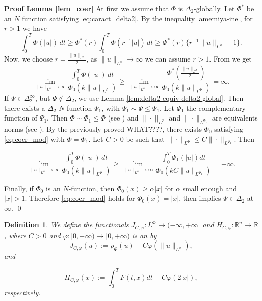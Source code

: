 \documentclass[twoside]{article}
\newtheorem{defi}[thm]{Definition}
\theoremstyle{remark}
\newcommand{\orlnor}{\|_{L^{\Phi}}}
\newcommand{\lphi}{L^{\Phi}}
\newcommand{\rr}{\mathbb{R}}
\renewcommand{\leq}{\leqslant}
\renewcommand{\geq}{\geqslant}
\begin{document}
\noindent\textbf{Proof Lemma \ref{lem_coer}} At first we assume that $\Phi$ is $\Delta_2$-globally. Let $\Phi^*$ be an $N$ function satisfying \eqref{eq:caract_delta2}. By the inequality \eqref{amemiya-ine}, for $r>1$ we have
\[
\int_0^T \Phi(|u|)\,dt\geq
\Phi^*(r) \int_0^T \Phi(r^{-1}|u|)\,dt\geq
\Phi^*(r)\{r^{-1}\|u\orlnor-1\}.
\]
Now, we choose $r=\frac{\|u\orlnor}{2}$, as $\|u\orlnor\to\infty$ we can assume $r>1$. From \cite[Thm. 2 (b)(v), p. 16]{rao1991theory} we get
\[
\lim\limits_{\|u\orlnor \to \infty} \frac{\int_0^T \Phi(|u|)\,dt}{\Phi_0(k\|u\orlnor)}\geq
\lim\limits_{\|u\orlnor \to \infty} \frac{\Phi^*\left(\frac{\|u\orlnor}{2}\right)}{\Phi_0(k\|u\orlnor)}
=\infty.
\]
 If $\Psi\in\Delta_2^{\infty}$, but $\Psi\notin\Delta_2$, we  use Lemma \ref{lem:delta2-equiv-delta2-global}. Then there exists a $\Delta_2$ $N$-function $\Psi_1$, with $\Psi_1\sim\Psi\leq \Psi_1$. Let $\Phi_1$ the complementary function of $\Psi_1$. Then $\Phi\sim\Phi_1\leq \Phi$ (see \cite[Thm. 3.1]{KR}) and $\|\cdot\orlnor$ and $\|\cdot\|_{L^{\Phi_1}}$ are equivalents norms  (see \cite[Thm. 13.2 and Thm. 13.3]{KR}). By the previously proved WHAT????, there exists $\Phi_0$ satisfying  \eqref{eq:coer_mod} with $\Phi=\Phi_1$. Let $C>0$ be such that  $\|\cdot\orlnor\leq C\|\cdot\|_{L^{\Phi_1}}$. Then

\[\lim\limits_{\|u\orlnor \to \infty}\frac{\int_0^T \Phi(|u|)\,dt}{\Phi_0(k\|u\orlnor)}\geq \lim\limits_{\|u\orlnor \to \infty} \frac{\int_0^T \Phi_1(|u|)dt}{\Phi_0(kC\|u\|_{L^{\Phi_1}})}=+\infty.\]


Finally, if $\Phi_0$ is an $N$-function, then $\Phi_0(x)\geq \alpha |x|$ for  $\alpha$ small enough and $|x|>1$.
Therefore \eqref{eq:coer_mod} holds for $\Phi_0(x)=|x|$, then \cite[Lemma 5.2]{ABGMS2015}  implies  $\Psi\in\Delta_2$ at $\infty$. \qed









\begin{defi}We define the  functionals $J_{C,\varphi}:\lphi\to (-\infty,+\infty]$ and $  H_{C,\varphi}:\rr^n\to \rr$, where $C>0$ and $\varphi:[0,+\infty)\to [0,+\infty)$ is an by
\begin{equation}\label{func_phi}
  J_{C,\varphi}(u):= \rho_{\Phi}\left(u\right)-C\varphi\left(\|u\orlnor\right),
\end{equation}
 and

\begin{equation}\label{eq:functional_H-bis}
 H_{C,\varphi}(x):=\int_0^TF(t,x)dt-C\varphi(2|x|),
\end{equation}
respectively.
\end{defi}
\end{document}
